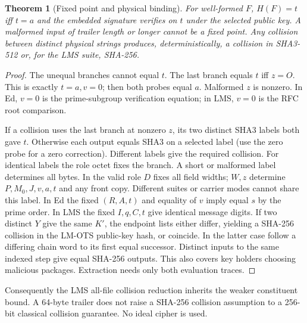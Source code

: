 \documentclass[10pt,twocolumn,letterpaper]{article}
\newtheorem{thm}{Theorem}
\begin{document}
\begin{thm}[Fixed point and physical binding]
For well-formed $F$, $H(F)=t$ iff $t=a$ and the embedded signature verifies on $t$ under the selected public key. A malformed input of trailer length or longer cannot be a fixed point. Any collision between distinct physical strings produces, deterministically, a collision in SHA3-512 or, for the LMS suite, SHA-256.
\end{thm}
\begin{proof}
The unequal branches cannot equal $t$. The last branch equals $t$ iff $z=O$. This is exactly $t=a,v=0$; then both probes equal $a$. Malformed $z$ is nonzero. In Ed, $v=0$ is the prime-subgroup verification equation; in LMS, $v=0$ is the RFC root comparison.

If a collision uses the last branch at nonzero $z$, its two distinct SHA3 labels both gave $t$. Otherwise each output equals SHA3 on a selected label (use the zero probe for a zero correction). Different labels give the required collision. For identical labels the role octet fixes the branch. A short or malformed label determines all bytes. In the valid role $D$ fixes all field widths; $W,z$ determine $P,M_0,J,v,a,t$ and any front copy. Different suites or carrier modes cannot share this label. In Ed the fixed $(R,A,t)$ and equality of $v$ imply equal $s$ by the prime order. In LMS the fixed $I,q,C,t$ give identical message digits. If two distinct $Y$ give the same $K'$, the endpoint lists either differ, yielding a SHA-256 collision in the LM-OTS public-key hash, or coincide. In the latter case follow a differing chain word to its first equal successor. Distinct inputs to the same indexed step give equal SHA-256 outputs. This also covers key holders choosing malicious packages. Extraction needs only both evaluation traces.
\end{proof}
Consequently the LMS all-file collision reduction inherits the weaker constituent bound. A 64-byte trailer does not raise a SHA-256 collision assumption to a 256-bit classical collision guarantee. No ideal cipher is used.
\end{document}
